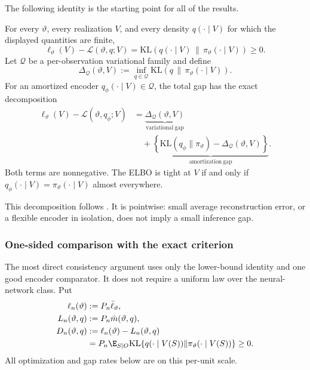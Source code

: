 The following identity is the starting point for all of the results.

\begin{proposition}
\label{prop:elbo_identity_decomposition}
For every $\vartheta$, every realization $V$, and every density $q(\cdot\mid
V)$ for which the displayed quantities are finite,
\begin{equation}
 \ell_\vartheta(V)-\mathcal L(\vartheta,q;V)
 =\mathrm{KL}\!\left(q(\cdot\mid V)\,\middle\|\,
 \pi_\vartheta(\cdot\mid V)\right)\geq 0.
 \label{eq:elbo_gap_identity_profile}
\end{equation}
Let $\mathcal Q$ be a per-observation variational family and define
\[
 \Delta_{\mathcal Q}(\vartheta,V)
 :=\inf_{q\in\mathcal Q}\mathrm{KL}
 \!\left(q\,\middle\|\,\pi_\vartheta(\cdot\mid V)\right).
\]
For an amortized encoder $q_\phi(\cdot\mid V)\in\mathcal Q$, the total gap
has the exact decomposition
\begin{align}
 \ell_\vartheta(V)-\mathcal L(\vartheta,q_\phi;V)
 &=\underbrace{\Delta_{\mathcal Q}(\vartheta,V)}_{
 \mathrm{variational\ gap}}
 \nonumber\\
 &\quad+
 \underbrace{\left\{
 \mathrm{KL}(q_\phi\|\pi_\vartheta)-
 \Delta_{\mathcal Q}(\vartheta,V)\right\}}_{
 \mathrm{amortization\ gap}}.
 \label{eq:gap_decomposition}
\end{align}
Both terms are nonnegative.  The ELBO is tight at $V$ if and only if
$q_\phi(\cdot\mid V)=\pi_\vartheta(\cdot\mid V)$ almost everywhere.
\end{proposition}

This decomposition follows \citet{cremer2018inference}.  It is pointwise:
small average reconstruction error, or a flexible encoder in isolation, does
not imply a small inference gap.

\subsubsection{One-sided comparison with the exact criterion}
\label{subsubsec:one_sided_comparison}

The most direct consistency argument uses only the lower-bound identity and
one good encoder comparator.  It does not require a uniform law over the
neural-network class.  Put
\begin{align}
 \ell_n(\vartheta)&:=P_n\bar\ell_\vartheta,\\
 L_n(\vartheta,q)&:=P_n\bar m(\vartheta,q),\\
 D_n(\vartheta,q)&:=\ell_n(\vartheta)-L_n(\vartheta,q)\\
 &=P_n\E_{S\mid O}\mathrm{KL}\{q(\cdot\mid V(S))\|\pi_\vartheta(\cdot\mid V(S))\}\geq0.
 \label{eq:normalized_elbo_comparison}
\end{align}
All optimization and gap rates below are on this per-unit scale.

